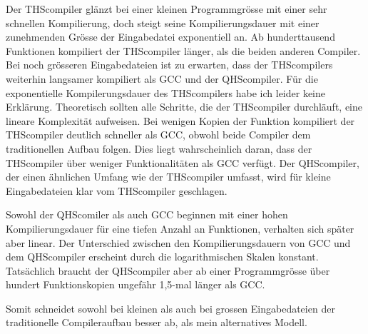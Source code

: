 Der THScompiler glänzt bei einer kleinen Programmgrösse mit einer sehr schnellen Kompilierung, doch steigt seine Kompilierungsdauer mit einer zunehmenden Grösse der Eingabedatei exponentiell an.
Ab hunderttausend Funktionen kompiliert der THScompiler länger, als die beiden anderen Compiler.
Bei noch grösseren Eingabedateien ist zu erwarten, dass der THScompilers weiterhin langsamer kompiliert als GCC und der QHScompiler.
Für die exponentielle Kompilerungsdauer des THScompilers habe ich leider keine Erklärung. Theoretisch sollten alle Schritte, die der THScompiler durchläuft, eine lineare Komplexität aufweisen.
Bei wenigen Kopien der Funktion kompiliert der THScompiler deutlich schneller als GCC, obwohl beide Compiler dem traditionellen Aufbau folgen.
Dies liegt wahrscheinlich daran, dass der THScompiler über weniger Funktionalitäten als GCC verfügt.
Der QHScompiler, der einen ähnlichen Umfang wie der THScompiler umfasst, wird für kleine Eingabedateien klar vom THScompiler geschlagen.

Sowohl der QHScomiler als auch GCC beginnen mit einer hohen Kompilierungsdauer für eine tiefen Anzahl an Funktionen, verhalten sich später aber linear.
Der Unterschied zwischen den Kompilierungsdauern von GCC und dem QHScompiler erscheint durch die logarithmischen Skalen konstant.
Tatsächlich braucht der QHScompiler aber ab einer Programmgrösse über hundert Funktionskopien ungefähr 1,5-mal länger als GCC. 

Somit schneidet sowohl bei kleinen als auch bei grossen Eingabedateien der traditionelle Compileraufbau besser ab, als mein alternatives Modell.


